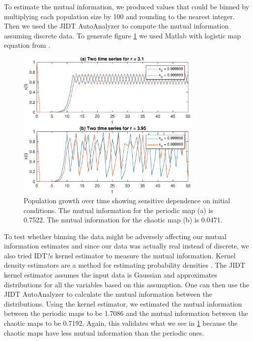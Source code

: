 \documentclass[conference]{IEEEtran}
\begin{document}
To estimate the mutual information, we produced values that could be binned by multiplying each population size by 100 and rounding to the nearest integer.  Then we used the JIDT AutoAnalyzer \cite{JIDT} to compute the mutual information assuming discrete data.  To generate figure \ref{figure1abcd} we used Matlab \cite{Matlab} with logistic map equation from \cite{Mitchell}.  


\begin{figure}[H]
\centering
 \includegraphics[width=90mm]{figure1abcd_combined}
    
  \caption{ Population growth over time showing sensitive dependence on initial conditions.  The mutual information for the periodic map (a) is 0.7522.  The mutual information for the chaotic map (b) is 0.0471.}
 \label{figure1abcd}
\end{figure} 
To test whether binning the data might be adversely affecting our mutual information estimates and since our data was actually real instead of discrete, we also tried IDT?s kernel estimator to measure the mutual information. 
Kernel density estimators are a method for estimating probability densities \cite{Moon}. The JIDT kernel estimator assumes the input data is Gaussian and approximates distributions for all the variables based on this assumption.  One can then use the JIDT AutoAnalyzer to calculate the mutual information between the distributions.   Using the kernel estimator, we estimated the mutual information between the periodic maps to be 1.7086 and the mutual information between the chaotic maps to be 0.7192.   Again, this validates what we see in \ref{figure1abcd} because the chaotic maps have less mutual information than the periodic ones.   
\end{document}
